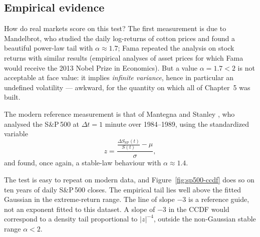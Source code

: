\subsection{Empirical evidence}

How do real markets score on this test?
The first measurement is due to Mandelbrot, who studied the daily log-returns of cotton prices\cite{Mandelbrot1963} and found a beautiful power-law tail with $\alpha \approx 1.7$; Fama repeated the analysis on stock returns with similar results\cite{Fama1965} (empirical analyses of asset prices for which Fama would receive the 2013 Nobel Prize in Economics).
But a value $\alpha = 1.7 < 2$ is not acceptable at face value: it implies \emph{infinite variance}, hence in particular an undefined volatility --- awkward, for the quantity on which all of Chapter~5 was built.

The modern reference measurement is that of Mantegna and Stanley \cite{MantegnaStanley1995}, who analysed the S\&P\,500 at $\Delta t = 1$ minute over 1984--1989, using the standardized variable
\begin{equation}
z = \frac{\frac{\Delta S_{\text{SP}}(t)}{S(t)} - \mu}{\sigma},
\end{equation}
and found, once again, a stable-law behaviour with $\alpha \approx 1.4$.

The test is easy to repeat on modern data, and Figure~\ref{fig:sp500-ccdf} does so on ten years of daily S\&P\,500 closes.
The empirical tail lies well above the fitted Gaussian in the extreme-return range.
The line of slope $-3$ is a reference guide, not an exponent fitted to this dataset.
A slope of $-3$ in the CCDF would correspond to a density tail proportional to $|z|^{-4}$, outside the non-Gaussian stable range $\alpha<2$.

